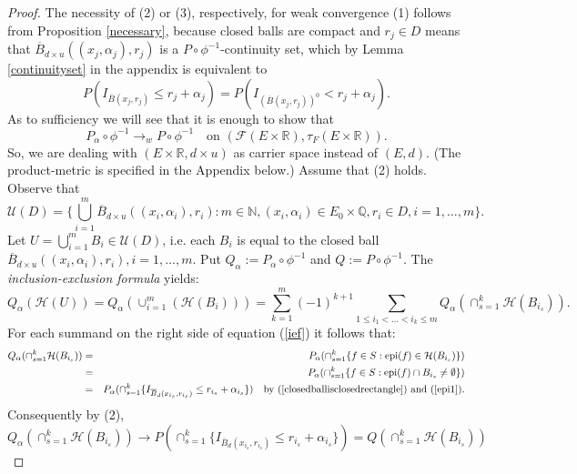 \documentclass[sn-mathphys,Numbered]{sn-jnl}%
\theoremstyle{thmstyleone}%
\theoremstyle{thmstyletwo}%
\theoremstyle{thmstylethree}%
\begin{document}
\begin{proof} The necessity of (2) or (3), respectively, for weak convergence (1) follows from Proposition \ref{necessary}, because closed balls are compact and $r_j \in D$ means that $\overline{B}_{d \times u}((x_j,\alpha_j),r_j)$ is a $P \circ \phi^{-1}$-continuity set, which by Lemma \ref{continuityset} in the appendix is equivalent to
\begin{equation} \label{continuitycondition}
P(I_{\overline{B}(x_j,r_j)} \le r_j+\alpha_j )= P(I_{(\overline{B}(x_j,r_j))^0} < r_j+\alpha_j).
\end{equation}
As to sufficiency we will see that it is enough to show that
\begin{equation} \label{Pphiweak}
P_\alpha \circ \phi^{-1} \rightarrow_w P \circ \phi^{-1} \quad \text{on } (\mathcal{F}(E \times \mathbb{R}),\tau_F(E \times \mathbb{R})).
\end{equation}
So, we are dealing with $(E \times \mathbb{R}, d \times u)$ as carrier space instead of $(E,d)$. (The product-metric is specified in the Appendix below.) Assume that (2) holds. Observe that
$$
 \mathcal{U}(D) = \{\bigcup_{i=1}^m \overline{B}_{d \times u}((x_i,\alpha_i),r_i): m \in \mathbb{N}, (x_i,\alpha_i) \in E_0 \times \mathbb{Q}, r_i \in D, i=1,\ldots,m\}.
$$
Let $U=\bigcup_{i=1}^m B_i \in \mathcal{U}(D)$, i.e. each $B_i$ is equal to the closed ball $\overline{B}_{d \times u}((x_i,\alpha_i),r_i), i=1,\ldots,m.$ Put $Q_\alpha := P_\alpha \circ \phi^{-1}$ and $Q := P \circ \phi^{-1}$. The \emph{inclusion-exclusion formula} yields:
\begin{equation} \label{ief}
Q_\alpha(\mathcal{H}(U))=Q_\alpha(\cup_{i=1}^m(\mathcal{H}(B_i)))=\sum_{k=1}^m (-1)^{k+1} \sum_{1 \le i_1<\ldots<i_k\le m} Q_\alpha(\cap_{s=1}^k \mathcal{H}(B_{i_s})).
\end{equation}
For each summand on the right side of equation (\ref{ief}) it follows that:
\begin{eqnarray*}
Q_\alpha(\cap_{s=1}^k \mathcal{H}(B_{i_s}))&=&P_\alpha(\cap_{s=1}^k \{f \in S: \text{epi}(f) \in \mathcal{H}(B_{i_s})\})\\
&=&P_\alpha(\cap_{s=1}^k \{f \in S: \text{epi}(f) \cap B_{i_s} \neq \emptyset\})\\
&=&P_\alpha(\cap_{s=1}^k \{I_{\overline{B}_d(x_{i_s},r_{i_s})} \le r_{i_s}+\alpha_{i_s}\}) \quad \text{by } (\ref{closedballisclosedrectangle}) \text{ and } (\ref{epi1}).
\end{eqnarray*}
Consequently by (2), $$Q_\alpha(\cap_{s=1}^k \mathcal{H}(B_{i_s})) \rightarrow P(\cap_{s=1}^k \{I_{\overline{B}_d(x_{i_s},r_{i_s})} \le r_{i_s}+\alpha_{i_s}\})=Q(\cap_{s=1}^k \mathcal{H}(B_{i_s}))$$

\end{proof}
\end{document}
